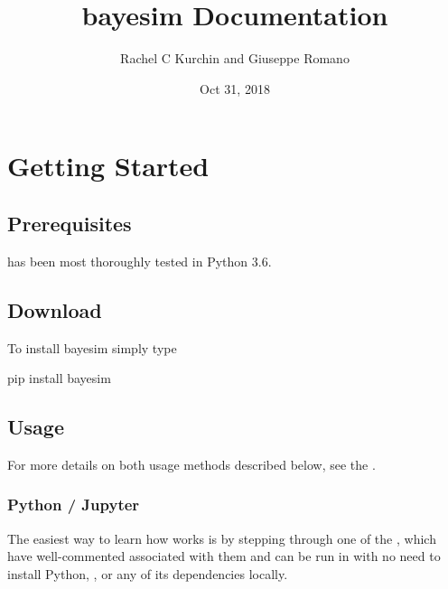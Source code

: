 \documentclass[letterpaper,10pt,english]{sphinxmanual}
\title{bayesim Documentation}
\date{Oct 31, 2018}
\author{Rachel C Kurchin and Giuseppe Romano}
\begin{document}
\maketitle
\sphinxtableofcontents
{}\label{\detokenize{index::doc}}



\chapter{Getting Started}
\label{\detokenize{gettingstarted:getting-started}}\label{\detokenize{gettingstarted::doc}}

\section{Prerequisites}
\label{\detokenize{gettingstarted:prerequisites}}
 has been most thoroughly tested in Python 3.6.


\section{Download}
\label{\detokenize{gettingstarted:download}}
To install bayesim simply type

%
\begin{sphinxVerbatim}[commandchars=\\\{\}]
pip install bayesim
\end{sphinxVerbatim}


\section{Usage}
\label{\detokenize{gettingstarted:usage}}
For more details on both usage methods described below, see the {\hyperref[\detokenize{manual::doc}]{}}.


\subsection{Python / Jupyter}
\label{\detokenize{gettingstarted:python-jupyter}}
The easiest way to learn how  works is by stepping through one of the {\hyperref[\detokenize{examples::doc}]{}}, which have well-commented  associated with them and can be run in  with no need to install Python, , or any of its dependencies locally.
\end{document}
